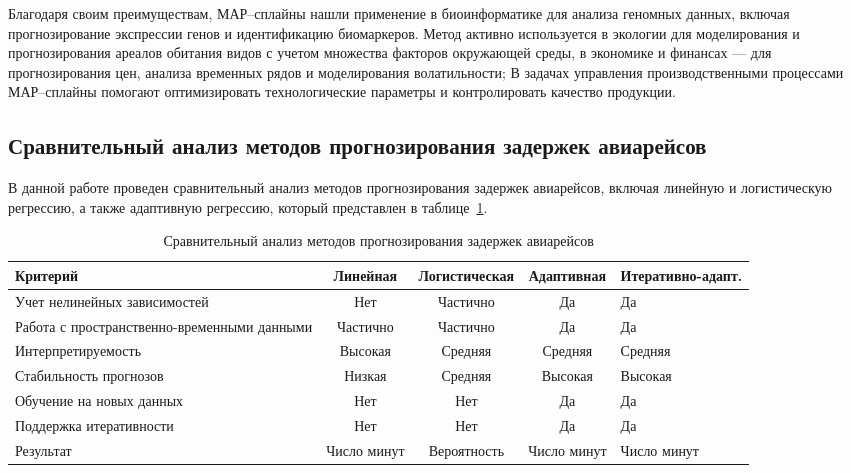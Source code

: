 Благодаря своим преимуществам, МАР--сплайны нашли применение в биоинформатике для анализа геномных данных, включая прогнозирование экспрессии генов и идентификацию биомаркеров.
Метод активно используется в экологии для моделирования и прогнозирования ареалов обитания видов с учетом множества факторов окружающей среды, в экономике и финансах --- для прогнозирования цен, анализа временных рядов и моделирования волатильности;
В задачах управления производственными процессами МАР--сплайны помогают оптимизировать технологические параметры и контролировать качество продукции.

\subsection{Сравнительный анализ методов прогнозирования задержек авиарейсов}

В данной работе проведен сравнительный анализ методов прогнозирования задержек авиарейсов, включая линейную и логистическую регрессию, а также адаптивную регрессию, который представлен в таблице~\ref{tab:tabl5}.

\begin{table}[H]
    \centering
    \small %
    \setlength{\tabcolsep}{5pt} %
    \renewcommand{\arraystretch}{1.2}
    \caption{Сравнительный анализ методов прогнозирования задержек авиарейсов}
    \begin{tabular}{|>{\centering}p{3.8cm}|c|c|c|>{\centering\arraybackslash}p{3cm}|}
        \hline
        \textbf{Критерий} & \textbf{Линейная} & \textbf{Логистическая} & \textbf{Адаптивная} & \textbf{Итеративно-адапт.} \\
        \hline
        Учет нелинейных зависимостей & Нет & Частично & Да & Да \\
        \hline
        Работа с пространственно-временными данными & Частично & Частично & Да & Да \\
        \hline
        Интерпретируемость & Высокая & Средняя & Средняя & Средняя \\
        \hline
        Стабильность прогнозов & Низкая & Средняя & Высокая & Высокая \\
        \hline
        Обучение на новых данных & Нет & Нет & Да & Да \\
        \hline
        Поддержка итеративности & Нет & Нет & Да & Да \\
        \hline
        Результат & Число минут & Вероятность & Число минут & Число минут \\
        \hline
    \end{tabular}
    \label{tab:tabl5}
\end{table}

